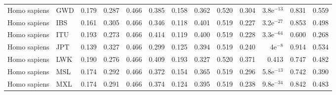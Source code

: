 \begin{longtable}{llrrrrrrrrrrr}
        Homo sapiens &                       GWD &                              0.179 &                               0.287 &                 0.466 &                 0.385 &                              0.158 &                               0.362 &                 0.520 &                 0.304 &  3.8e$^{-13}$ &  0.831 &  0.559 \\
        Homo sapiens &                       IBS &                              0.161 &                               0.305 &                 0.466 &                 0.346 &                              0.118 &                               0.401 &                 0.519 &                 0.227 &  3.2e$^{-27}$ &  0.853 &  0.498 \\
        Homo sapiens &                       ITU &                              0.193 &                               0.273 &                 0.466 &                 0.414 &                              0.119 &                               0.400 &                 0.519 &                 0.228 &  3.3e$^{-64}$ &  0.600 &  0.268 \\
        Homo sapiens &                       JPT &                              0.139 &                               0.327 &                 0.466 &                 0.299 &                              0.125 &                               0.394 &                 0.519 &                 0.240 &     4e$^{-8}$ &  0.914 &  0.534 \\
        Homo sapiens &                       LWK &                              0.190 &                               0.276 &                 0.466 &                 0.409 &                              0.193 &                               0.327 &                 0.520 &                 0.371 &         0.413 &  0.747 &  0.482 \\
        Homo sapiens &                       MSL &                              0.174 &                               0.292 &                 0.466 &                 0.372 &                              0.154 &                               0.365 &                 0.519 &                 0.296 &  5.8e$^{-13}$ &  0.742 &  0.390 \\
        Homo sapiens &                       MXL &                              0.174 &                               0.291 &                 0.466 &                 0.374 &                              0.124 &                               0.395 &                 0.519 &                 0.238 &  9.8e$^{-34}$ &  0.842 &  0.483 \\

\end{longtable}
